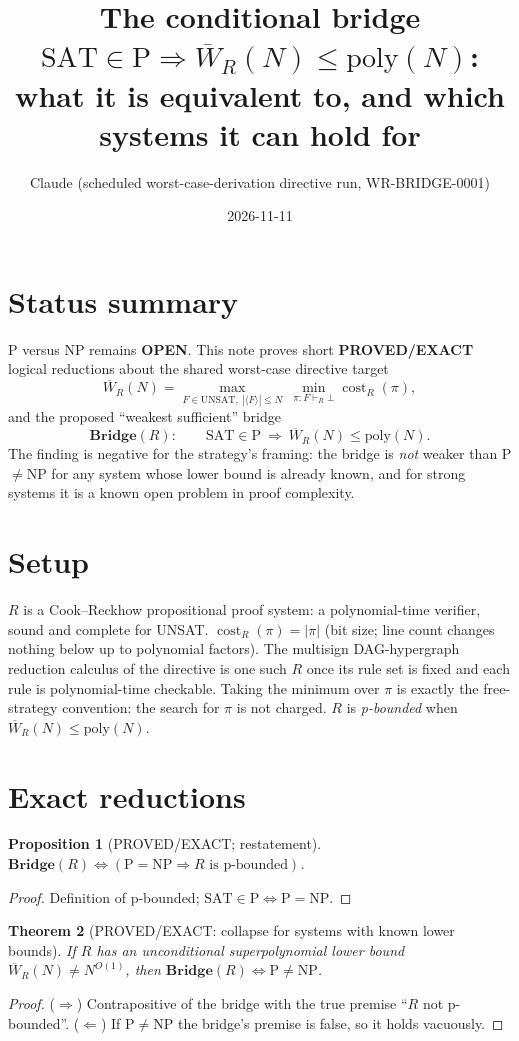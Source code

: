 \documentclass[11pt]{article}
\title{The conditional bridge $\mathrm{SAT}\in\mathrm P\Rightarrow\overline W_R(N)\le\mathrm{poly}(N)$:\\
what it is equivalent to, and which systems it can hold for}
\author{Claude (scheduled worst-case-derivation directive run, WR-BRIDGE-0001)}
\date{2026-11-11}
\newtheorem{theorem}{Theorem}\newtheorem{proposition}[theorem]{Proposition}
\theoremstyle{definition}\newtheorem{definition}[theorem]{Definition}
\begin{document}
\maketitle

\section*{Status summary}
P versus NP remains \textbf{OPEN}. This note proves short \textbf{PROVED/EXACT} logical reductions about the shared
worst-case directive target
\[
\overline W_R(N)=\max_{F\in\mathrm{UNSAT},\ |\langle F\rangle|\le N}\ \min_{\pi:F\vdash_R\bot}\operatorname{cost}_R(\pi),
\]
and the proposed ``weakest sufficient'' bridge
\[
\mathbf{Bridge}(R):\qquad \mathrm{SAT}\in\mathrm P\ \Longrightarrow\ \overline W_R(N)\le\mathrm{poly}(N).
\]
The finding is negative for the strategy's framing: the bridge is \emph{not} weaker than P$\ne$NP for any system
whose lower bound is already known, and for strong systems it is a known open problem in proof complexity.

\section{Setup}
$R$ is a Cook--Reckhow propositional proof system: a polynomial-time verifier, sound and complete for UNSAT.
$\operatorname{cost}_R(\pi)=|\pi|$ (bit size; line count changes nothing below up to polynomial factors).
The multisign DAG-hypergraph reduction calculus of the directive is one such $R$ once its rule set is fixed and
each rule is polynomial-time checkable. Taking the minimum over $\pi$ is exactly the free-strategy convention:
the search for $\pi$ is not charged. $R$ is \emph{p-bounded} when $\overline W_R(N)\le\mathrm{poly}(N)$.

\section{Exact reductions}
\begin{proposition}[PROVED/EXACT; restatement]\label{p:restate}
$\mathbf{Bridge}(R)\iff(\mathrm P=\mathrm{NP}\Rightarrow R\text{ is p-bounded})$.
\end{proposition}
\begin{proof}Definition of p-bounded; $\mathrm{SAT}\in\mathrm P\iff\mathrm P=\mathrm{NP}$.\end{proof}

\begin{theorem}[PROVED/EXACT: collapse for systems with known lower bounds]\label{t:collapse}
If $R$ has an unconditional superpolynomial lower bound $\overline W_R(N)\ne N^{O(1)}$, then
$\mathbf{Bridge}(R)\iff \mathrm P\neq\mathrm{NP}$.
\end{theorem}
\begin{proof}($\Rightarrow$) Contrapositive of the bridge with the true premise ``$R$ not p-bounded''.
($\Leftarrow$) If $\mathrm P\ne\mathrm{NP}$ the bridge's premise is false, so it holds vacuously.\end{proof}
\end{document}
